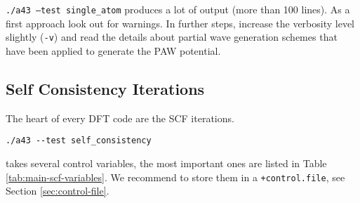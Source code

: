 \documentclass[oribibl]{llncs}
\newcommand{\ttt}[1]{\texttt{#1}}
\begin{document}
\noindent
\ttt{./a43 --test single\_atom} produces a lot of output (more than 100 lines).
As a first approach look out for warnings.
In further steps, increase the verbosity level slightly (\ttt{-v}) and read the details about partial wave generation schemes that have been applied to generate the \ac{PAW} potential.


\subsection{Self Consistency Iterations} \label{sec:self-consistency}
%
The heart of every \ac{DFT} code are the \ac{SCF} iterations.
\begin{verbatim}
./a43 --test self_consistency
\end{verbatim}
takes several control variables, the most important ones are listed in Table \ref{tab:main-scf-variables}.
We recommend to store them in a \ttt{+control.file}, see Section \ref{sec:control-file}.
%
\end{document}
